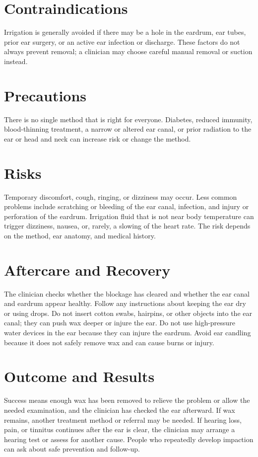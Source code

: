 \section*{Contraindications}
Irrigation is generally avoided if there may be a hole in the eardrum, ear tubes, prior ear surgery, or an active ear infection or discharge. These factors do not always prevent removal; a clinician may choose careful manual removal or suction instead.

\section*{Precautions}
There is no single method that is right for everyone. Diabetes, reduced immunity, blood-thinning treatment, a narrow or altered ear canal, or prior radiation to the ear or head and neck can increase risk or change the method.

\section*{Risks}
Temporary discomfort, cough, ringing, or dizziness may occur. Less common problems include scratching or bleeding of the ear canal, infection, and injury or perforation of the eardrum. Irrigation fluid that is not near body temperature can trigger dizziness, nausea, or, rarely, a slowing of the heart rate. The risk depends on the method, ear anatomy, and medical history.

\section*{Aftercare and Recovery}
The clinician checks whether the blockage has cleared and whether the ear canal and eardrum appear healthy. Follow any instructions about keeping the ear dry or using drops. Do not insert cotton swabs, hairpins, or other objects into the ear canal; they can push wax deeper or injure the ear. Do not use high-pressure water devices in the ear because they can injure the eardrum. Avoid ear candling because it does not safely remove wax and can cause burns or injury.

\section*{Outcome and Results}
Success means enough wax has been removed to relieve the problem or allow the needed examination, and the clinician has checked the ear afterward. If wax remains, another treatment method or referral may be needed. If hearing loss, pain, or tinnitus continues after the ear is clear, the clinician may arrange a hearing test or assess for another cause. People who repeatedly develop impaction can ask about safe prevention and follow-up.

